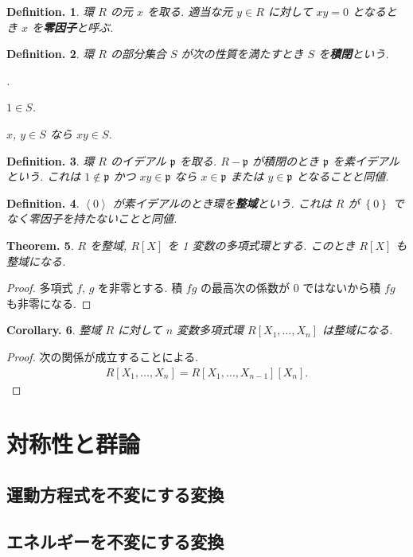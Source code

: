 \documentclass[openany, a4paper, oneside]{jsbook}
\newcounter{enum2}
\renewenvironment{enumerate}{%
\begin{list}%
{%
\arabic{enum2}.\ \,%
}%
{%
\usecounter{enum2}
\setlength{\itemindent}{0pt}%
\setlength{\leftmargin}{15pt}%
\setlength{\rightmargin}{0pt}%
\setlength{\labelsep}{0pt}%
\setlength{\labelwidth}{6pt}%
\setlength{\itemsep}{0pt}%
\setlength{\parsep}{0pt}%
\setlength{\listparindent}{0pt}%
}
}{%
\end{list}%
}
\theoremstyle{break}
\theoremstyle{breakdefn}
\newtheorem{thm}{Theorem.}[section]
\newtheorem{cor}[thm]{Corollary.}
\newtheorem{defn}[thm]{Definition.}
\newcommand{\sqbk}[1]{\left[#1\right]}
\newcommand{\cbk}[1]{\left\{#1\right\}}
\newcommand{\abk}[1]{\left\langle #1 \right\rangle}
\newcommand{\frakp}{\mathfrak{p}}
\begin{document}
\begin{defn}
 環 $R$ の元 $x$ を取る.
 適当な元 $y \in R$ に対して $xy = 0$ となるとき $x$ を\textbf{零因子}と呼ぶ.
\end{defn}
\begin{defn}
 環 $R$ の部分集合 $S$ が次の性質を満たすとき $S$ を\textbf{積閉}という.
\begin{enumerate}
\item $1 \in S$.
\item $x$, $y \in S$ なら $xy \in S$.
\end{enumerate}
\end{defn}
\begin{defn}
 環 $R$ のイデアル $\frakp$ を取る.
 $R - \frakp$ が積閉のとき $\frakp$ を素イデアルという.
 これは $1 \notin \frakp$ かつ $xy \in \frakp$ なら $x \in \frakp$ または $y \in \frakp$ となることと同値.
\end{defn}
\begin{defn}
 $\abk{0}$ が素イデアルのとき環を\textbf{整域}という.
 これは $R$ が $\cbk{0}$ でなく零因子を持たないことと同値.
\end{defn}
\begin{thm}
 $R$ を整域, $R \sqbk{X}$ を 1 変数の多項式環とする.
 このとき $R \sqbk{X}$ も整域になる.
\end{thm}
\begin{proof}
多項式 $f$, $g$ を非零とする.
積 $fg$ の最高次の係数が $0$ ではないから積 $fg$ も非零になる.
\end{proof}
\begin{cor}
 整域 $R$ に対して $n$ 変数多項式環 $R \sqbk{X_1, \dots, X_n}$ は整域になる.
\end{cor}
\begin{proof}
次の関係が成立することによる.
\begin{align}
 R \sqbk{X_1, \dots, X_n}
 =
 R \sqbk{X_1, \dots, X_{n-1}} \sqbk{X_n}.
\end{align}
\end{proof}
\chapter{対称性と群論}

\section{運動方程式を不変にする変換}

\section{エネルギーを不変にする変換}
\end{document}
